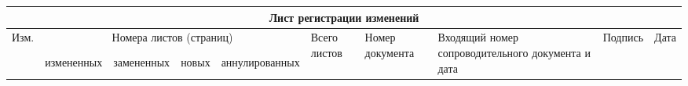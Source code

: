  \newpage           
 \begin{table}[H] \small 
 \label{tab:reg change} 
 	\begin{center}
 		\begin{tabular}{|p{0.8cm}|p{1.3cm}|p{1.3cm}|p{1.3cm}|p{1.8cm}|p{1.2cm}|p{1.2cm}|p{2cm}|p{1.4cm}|p{1cm}|}
 			\hline
 			\multicolumn{10}{|c|}{Лист регистрации изменений} \\ \hline
 			
 			\multirow{2}{0.8cm}{Изм.} & \multicolumn{4}{c|}{Номера лис\-тов (страниц)} & \multirow{2}{1.2cm}{Всего листов} & \multirow{2}{1.2 cm}{Номер доку\-мента} & \multirow{2}{2cm}{Входящий номер сопроводительного документа и дата} &\multirow{2}{1.4cm}{Подпись}&\multirow{2}{1cm}{Дата} \\
 			\cline{2-5}
 			& изме\-ненных & заме\-ненных & новых & аннулиро\-ванных &&  & & & \\
 			

\end{tabular}
\end{center}
\end{table}
